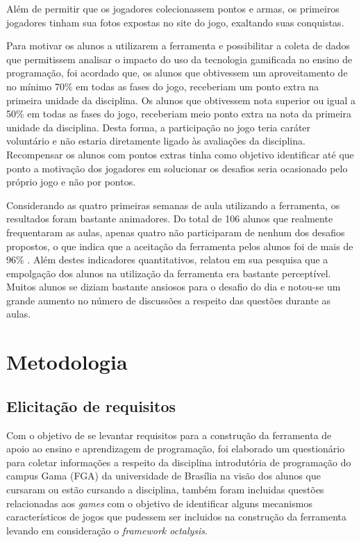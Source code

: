 Além de permitir que os jogadores colecionassem pontos e armas, os primeiros jogadores tinham sua fotos expostas no
site do jogo, exaltando suas conquistas.

Para motivar os alunos a utilizarem a ferramenta e possibilitar a coleta de dados que permitissem analisar o 
impacto do uso da tecnologia gamificada no ensino de programação, foi acordado que, os alunos que obtivessem 
um aproveitamento de no mínimo 70\% em todas as fases do jogo, receberiam um ponto extra na primeira unidade 
da disciplina. Os alunos que obtivessem nota superior ou igual a 50\% em todas as fases do jogo, receberiam 
meio ponto extra na nota da primeira unidade da disciplina. Desta forma, a participação no jogo teria caráter 
voluntário e não estaria diretamente ligado às avaliações da disciplina. Recompensar os alunos com pontos extras
tinha como objetivo identificar até que ponto a motivação dos jogadores em solucionar os desafios seria ocasionado
pelo próprio jogo e não por pontos.

Considerando as quatro primeiras semanas de aula utilizando a ferramenta, os resultados foram bastante animadores.
Do total de 106 alunos que realmente frequentaram as aulas, apenas quatro não participaram de nenhum dos desafios 
propostos, o que indica que a aceitação da ferramenta pelos alunos foi de mais de 96\% . Além destes indicadores 
quantitativos, \cite{raposo2016desafio} relatou em sua pesquisa que a empolgação dos alunos na utilização da 
ferramenta era bastante perceptível. Muitos alunos se diziam bastante ansiosos para o desafio do dia e notou-se um 
grande aumento no número de discussões a respeito das questões durante as aulas.

\chapter{Metodologia}

\section{Elicitação de requisitos}
Com o objetivo de se levantar requisitos para a construção da ferramenta de apoio ao ensino e aprendizagem de 
programação, foi elaborado um questionário para coletar informações a respeito da disciplina introdutória de programação 
do campus Gama (FGA) da universidade de Brasília na visão dos alunos que cursaram ou estão cursando a disciplina, também 
foram incluidas  questões relacionadas aos \textit{games} com o objetivo de identificar alguns mecanismos característicos
de jogos que pudessem ser incluidos na construção da ferramenta levando em consideração o \textit{framework octalysis}.

